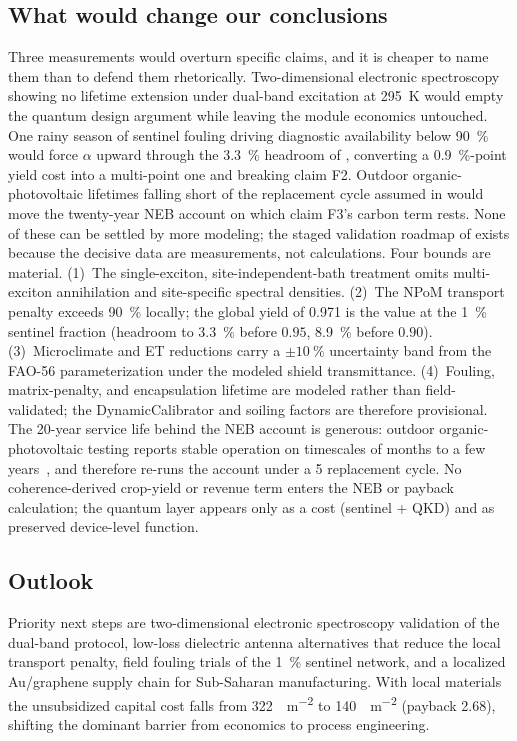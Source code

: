 \documentclass[preprint,12pt]{elsarticle}
\begin{document}
\subsection{What would change our conclusions}
Three measurements would overturn specific claims, and it is cheaper to name them than to defend them rhetorically. Two-dimensional electronic spectroscopy showing no lifetime extension under dual-band excitation at \qty{295}{\kelvin} would empty the quantum design argument while leaving the module economics untouched. One rainy season of sentinel fouling driving diagnostic availability below \qty{90}{\percent} would force $\alpha$ upward through the \qty{3.3}{\percent} headroom of , converting a \qty{0.9}{\percent}-point yield cost into a multi-point one and breaking claim F2. Outdoor organic-photovoltaic lifetimes falling short of the replacement cycle assumed in  would move the twenty-year NEB account on which claim F3's carbon term rests. None of these can be settled by more modeling; the staged validation roadmap of  exists because the decisive data are measurements, not calculations.
Four bounds are material. (1)~The single-exciton, site-independent-bath treatment omits multi-exciton annihilation and site-specific spectral densities. (2)~The NPoM transport penalty exceeds \qty{90}{\percent} locally; the global yield of \num{0.971} is the value at the \qty{1}{\percent} sentinel fraction (headroom to \qty{3.3}{\percent} before $0.95$, \qty{8.9}{\percent} before $0.90$). (3)~Microclimate and ET reductions carry a $\pm\qty{10}{\percent}$ uncertainty band from the FAO-56 parameterization under the modeled shield transmittance. (4)~Fouling, matrix-penalty, and encapsulation lifetime are modeled rather than field-validated; the DynamicCalibrator and soiling factors are therefore provisional. The 20-year service life behind the NEB account is generous: outdoor organic-photovoltaic testing reports stable operation on timescales of months to a few years~\cite{Zhang2018,Kettle2022}, and  therefore re-runs the account under a \qty{5}{\yr} replacement cycle. No coherence-derived crop-yield or revenue term enters the NEB or payback calculation; the quantum layer appears only as a cost (sentinel + QKD) and as preserved device-level function.

\subsection{Outlook}
Priority next steps are two-dimensional electronic spectroscopy validation of the dual-band protocol, low-loss dielectric antenna alternatives that reduce the local transport penalty, field fouling trials of the \qty{1}{\percent} sentinel network, and a localized Au/graphene supply chain for Sub-Saharan manufacturing. With local materials the unsubsidized capital cost falls from \qty{322}{\USD\per\m\squared} to \qty{140}{\USD\per\m\squared} (payback \qty{2.68}{\yr}), shifting the dominant barrier from economics to process engineering.
\end{document}
